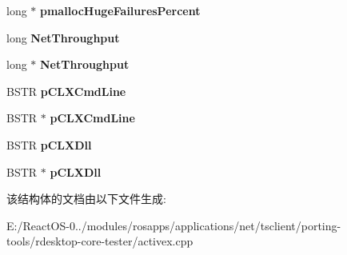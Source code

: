 \begin{DoxyCompactItemize}
long $\ast$ {\bfseries pmalloc\+Huge\+Failures\+Percent}
\item 
\mbox{\label{struct_m_s_t_s_c_lib_1_1_i_ms_tsc_debug_vtbl_aa7c4b244d8bbc09073ebcf41fd5895f3}} 
long {\bfseries Net\+Throughput}
\item 
\mbox{\label{struct_m_s_t_s_c_lib_1_1_i_ms_tsc_debug_vtbl_ac5c56d703d7612af331c1ef808c84837}} 
long $\ast$ {\bfseries Net\+Throughput}
\item 
\mbox{\label{struct_m_s_t_s_c_lib_1_1_i_ms_tsc_debug_vtbl_a429a75af4a16abc84cbf112e8f288cd4}} 
B\+S\+TR {\bfseries p\+C\+L\+X\+Cmd\+Line}
\item 
\mbox{\label{struct_m_s_t_s_c_lib_1_1_i_ms_tsc_debug_vtbl_a75c58152cce2821b034c69bdcfbb1b90}} 
B\+S\+TR $\ast$ {\bfseries p\+C\+L\+X\+Cmd\+Line}
\item 
\mbox{\label{struct_m_s_t_s_c_lib_1_1_i_ms_tsc_debug_vtbl_a26e1113471752c700ca0f513406657f1}} 
B\+S\+TR {\bfseries p\+C\+L\+X\+Dll}
\item 
\mbox{\label{struct_m_s_t_s_c_lib_1_1_i_ms_tsc_debug_vtbl_a1c6e68622749bfab4acf5aab8f0e746c}} 
B\+S\+TR $\ast$ {\bfseries p\+C\+L\+X\+Dll}
\end{DoxyCompactItemize}


该结构体的文档由以下文件生成\+:\begin{DoxyCompactItemize}
\item 
E\+:/\+React\+O\+S-\/0../modules/rosapps/applications/net/tsclient/porting-\/tools/rdesktop-\/core-\/tester/activex.\+cpp\end{DoxyCompactItemize}
